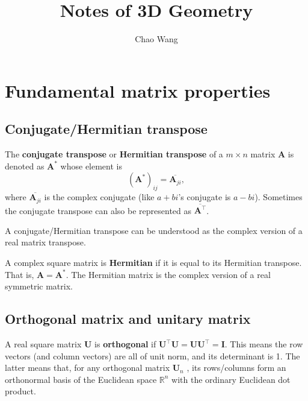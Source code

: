 \documentclass[12pt]{article}
\numberwithin{equation}{section}
\begin{document}


\title{Notes of 3D Geometry}%
\author{Chao Wang} %

\maketitle

\tableofcontents

\newpage

\section{Fundamental matrix properties}

\subsection{Conjugate/Hermitian transpose}

The \textbf{conjugate transpose} or \textbf{Hermitian transpose } of a $m\times n$ matrix $\mathbf{A}$ is denoted as $\mathbf{A}^*$ whose element is
\begin{equation}
(\mathbf{A}^*)_{ij} = \overline{\mathbf{A}_{ji}},
\end{equation}
where $\overline{\mathbf{A}_{ji}}$ is the complex conjugate (like $a + bi$'s conjugate is $a - bi$). Sometimes the conjugate transpose can also be represented as $\overline{\mathbf{A}^\top}$.

A conjugate/Hermitian transpose can be understood as the complex version of a real matrix transpose.

A complex square matrix is \textbf{Hermitian} if it is equal to its Hermitian transpose. That is, $\mathbf{A = A^*}$. The Hermitian matrix is the complex version of a real symmetric matrix.

\subsection{Orthogonal matrix and unitary matrix}
\label{sec:orthogonal}

A real square matrix $\mathbf{U}$ is \textbf{orthogonal} if $\mathbf{U}^\top\mathbf{U} = \mathbf{U} \mathbf{U}^\top = \mathbf{I}$. This means the row vectors (and column vectors) are all of unit norm, and its determinant is 1. The latter means that, for any orthogonal matrix $\mathbf{U}_n$ , its rows/columns form an orthonormal basis of the Euclidean space $\mathbb{R}^n$ with the ordinary Euclidean dot product.
\end{document}
